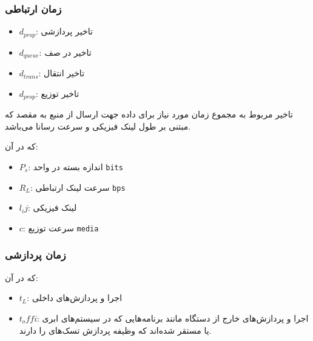\documentclass[a4paper]{article}
\begin{document}
\subsubsection{زمان ارتباطی}


\begin{itemize}
    \item $d_{prop}$: تاخیر پردازشی
    \item $d_{queue}$: تاخیر در صف
    \item $d_{trans}$: تاخیر انتقال
    \item $d_{prop}$: تاخیر توزیع
\end{itemize}

تاخیر مربوط به  مجموع زمان مورد نیاز برای داده جهت ارسال از منبع
به مقصد که مبتنی بر طول لینک فیزیکی و سرعت رسانا می‌باشد.


که در آن:

\begin{itemize}
    \item $P_s$: اندازه بسته در واحد \texttt{bits}
    \item $R_L$: سرعت لینک ارتباطی \texttt{bps}
\end{itemize}


\begin{itemize}
    \item $l_ij$: لینک فیزیکی
    \item $c$: سرعت توزیع \texttt{media}
\end{itemize}

\subsubsection{زمان پردازشی}


که در آن:

\begin{itemize}
    \item $t_L$: اجرا و پردازش‌های داخلی
    \item $t_offi$: اجرا و پردازش‌های خارج از دستگاه  مانند برنامه‌هایی
    که در سیستم‌های ابری یا  مستقر شده‌اند که وظیفه پردازش تسک‌های
     را دارند.
\end{itemize}
\end{document}
